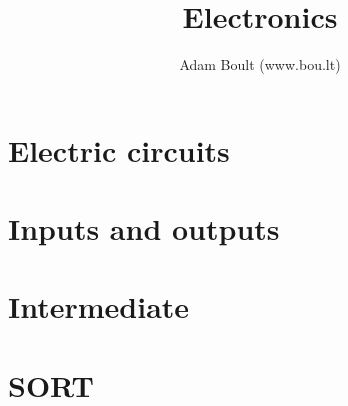\documentclass[oneside]{book}
\begin{document}
\author{Adam Boult (www.bou.lt)}
\title{Electronics}
\maketitle

\setcounter{tocdepth}{0}
\tableofcontents



\part{Electric circuits}





\part{Inputs and outputs}







\part{Intermediate}



\part{SORT}

\end{document}
